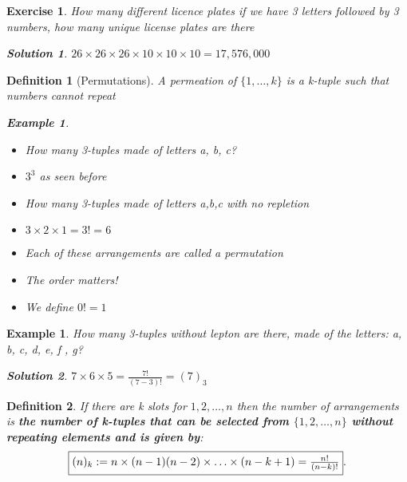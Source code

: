 \documentclass[a4paper]{article}
\newcounter{counter}
\numberwithin{counter}{subsection}
\theoremstyle{break}
\newtheorem{definition}{Definition}
\newtheorem{exmp}[counter]{Example}
\newtheorem*{solution}{Solution}
\newtheorem{exe}[counter]{Exercise}
\begin{document}
		\begin{exe}
			How many different licence plates if we have 3 letters followed by 3 numbers, how many unique license plates are there
			\begin{solution}
				$26 \times 26 \times 26 \times 10 \times 10 \times 10 = 17,576,000$
			\end{solution}
		\end{exe}

		\begin{definition}[Permutations]
			A permeation of $\{1, \ldots, k\} $ is a k-tuple such that numbers cannot repeat
			\begin{exmp}
				\begin{itemize}
					\item How many 3-tuples made of letters a, b, c?
					\item $3^3$ as seen before
					\item How many 3-tuples made of letters a,b,c with no repletion 
					\item $3 \times 2 \times 1 = 3! = 6$
				\end{itemize}
			\end{exmp}

			\begin{itemize}
				\item Each of these arrangements are called a permutation 
					\item The order matters!
				\begin{center}
				\end{center}
						\item We define $0! = 1$
			\end{itemize}
		\end{definition}

		\begin{exmp}
			How many 3-tuples without lepton are there, made of the letters: a, b, c, d, e, f , g? 
			\begin{solution}
				$7 \times 6 \times  5 = \frac{7!}{(7-3)!} = (7)_3$
			\end{solution}
		\end{exmp}

		\begin{definition}
			If there are k slots for $1,2,\ldots,n$ then the number of arrangements is \textbf{the number of k-tuples that can be selected from $\{1,2,\ldots,n\} $ without repeating elements and is given by}:
		\[ \fbox{$(n)_k := n \times (n-1) (n - 2) \times \ldots \times (n - k + 1) = \frac{n!}{(n-k)!}$}.\]
		\end{definition}
\end{document}

